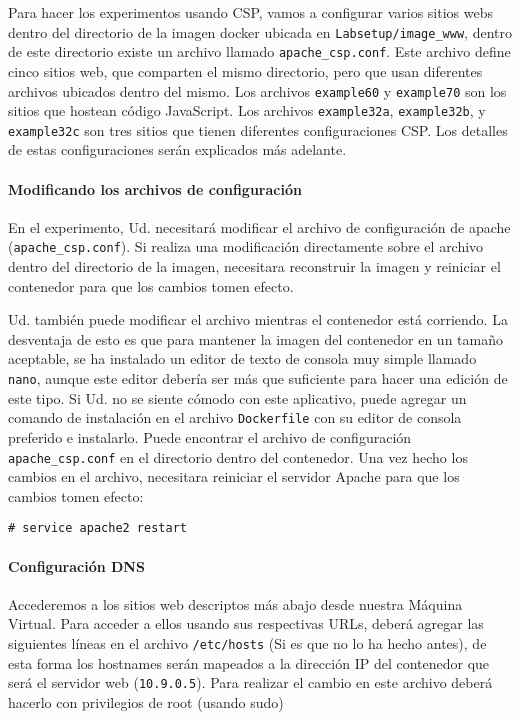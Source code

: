 Para hacer los experimentos usando CSP, vamos a configurar varios sitios webs dentro del directorio de la imagen docker ubicada en \texttt{Labsetup/image\_www}, dentro de este directorio existe un archivo llamado \texttt{apache\_csp.conf}. 
Este archivo define cinco sitios web, que comparten el mismo directorio, pero que usan diferentes archivos ubicados dentro del mismo.
Los archivos \texttt{example60} y \texttt{example70} son los sitios que hostean código JavaScript.
Los archivos \texttt{example32a}, \texttt{example32b}, y 
\texttt{example32c} son tres sitios que tienen diferentes configuraciones CSP. Los detalles de estas configuraciones serán explicados más adelante.


\paragraph{Modificando los archivos de configuración}
En el experimento, Ud. necesitará modificar el archivo de configuración de apache (\texttt{apache\_csp.conf}). Si realiza una modificación directamente sobre el archivo dentro del directorio de la imagen, necesitara reconstruir la imagen y reiniciar el contenedor para que los cambios tomen efecto.

Ud. también puede modificar el archivo mientras el contenedor está corriendo. La desventaja de esto es que para mantener la imagen del contenedor en un tamaño aceptable, se ha instalado un editor de texto de consola muy simple llamado \texttt{nano}, aunque este editor debería ser más que suficiente para hacer una edición de este tipo. Si Ud. no se siente cómodo con este aplicativo, puede agregar un comando de instalación en el archivo \texttt{Dockerfile} con su editor de consola preferido e instalarlo.
Puede encontrar el archivo de configuración \texttt{apache\_csp.conf} en el directorio  dentro del contenedor.
Una vez hecho los cambios en el archivo, necesitara reiniciar el servidor Apache para que los cambios tomen efecto:

\begin{lstlisting}
# service apache2 restart
\end{lstlisting}


\paragraph{Configuración DNS}
Accederemos a los sitios web descriptos más abajo desde nuestra Máquina Virtual. 
Para acceder a ellos usando sus respectivas URLs, deberá agregar las siguientes líneas en el archivo \texttt{/etc/hosts} (Si es que no lo ha hecho antes), de esta forma los hostnames serán mapeados a la dirección IP del contenedor que será el servidor web (\texttt{10.9.0.5}). 
Para realizar el cambio en este archivo deberá hacerlo con privilegios de root (usando sudo)

